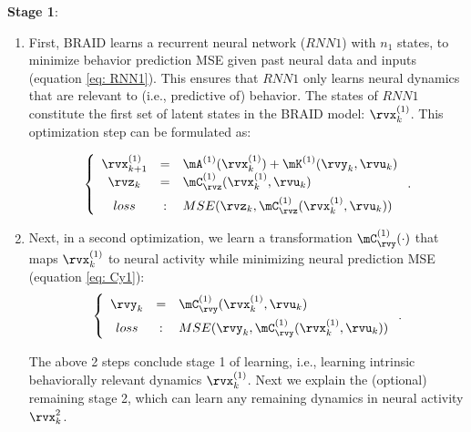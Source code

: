 \documentclass{article} %
\newcommand{\RNN}[1]{\(\textit{RNN#1}\)} %
\newcommand{\ourmethod}{BRAID}
\begin{document}
\textbf{Stage 1}\label{stage1}: 
\begin{enumerate}[leftmargin=*]
        \item[\textbf{1a}]
        First, \ourmethod{} learns a recurrent neural network (\RNN1) with $n_1$ states, to minimize behavior prediction MSE given past neural data and inputs (equation \ref{eq: RNN1}). This ensures that \RNN1 only learns neural dynamics that are relevant to (i.e., predictive of) behavior. The states of \RNN1 constitute the first set of latent states in the \ourmethod{} model: \(\rvx_{k}^{(1)}\). This optimization step can be formulated as:

    \begin{equation}\label{eq: RNN1}
        \left\{
        \begin{array}{ccl}
        \rvx_{k+1}^{(1)} &=& \mA^{(1)}(\rvx_{k}^{(1)}) + \mK^{(1)}(\rvy_{k}, \rvu_{k})\\
        \rvz_{k} &=& \mC_{\rvz}^{(1)}(\rvx_{k}^{(1)}, \rvu_{k})\\[5pt]
        loss&:& MSE(\rvz_{k}, \mC_{\rvz}^{(1)}(\rvx_{k}^{(1)}, \rvu_{k}))
        \end{array}
        \right.
        .
    \end{equation}

    \item[\textbf{1b}]
    Next, in a second optimization, we learn a transformation \(\mC_{\rvy}^{(1)}(\cdot)\) that maps \(\rvx_{k}^{(1)}\) to neural activity while minimizing neural prediction MSE (equation \ref{eq: Cy1}):
    \begin{equation}\label{eq: Cy1}
        \left\{
        \begin{array}{ccl}
        \rvy_{k} &=& \mC_{\rvy}^{(1)}(\rvx_{k}^{(1)}, \rvu_{k})\\[5pt]
        loss&:& MSE(\rvy_{k}, \mC_{\rvy}^{(1)}(\rvx_{k}^{(1)}, \rvu_{k}))
        \end{array}
        \right.
        .
    \end{equation}

    The above 2 steps conclude stage 1 of learning, i.e., learning intrinsic behaviorally relevant dynamics \(\rvx^{(1)}_k\). Next we explain the (optional) remaining stage 2, which can learn any remaining dynamics in neural activity \(\rvx^{2}_k\).
    \newline
\end{enumerate}
\end{document}
